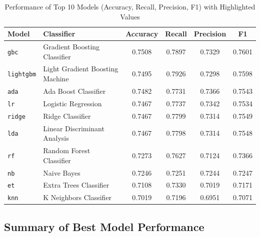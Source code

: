 \documentclass[a4paper,12pt]{article}
\begin{document}
\begin{table}[h!]
\centering
\begin{tabular}{l l c c c c}
\toprule
\textbf{Model} & \textbf{Classifier} & \textbf{Accuracy} & \textbf{Recall} & \textbf{Precision} & \textbf{F1} \\
\midrule
\texttt{gbc} & Gradient Boosting Classifier & \cellcolor{yellow}0.7508 & 0.7897 & 0.7329 & \cellcolor{yellow}0.7601 \\
\texttt{lightgbm} & Light Gradient Boosting Machine & 0.7495 & \cellcolor{yellow}0.7926 & 0.7298 & 0.7598 \\
\texttt{ada} & Ada Boost Classifier & 0.7482 & 0.7731 & \cellcolor{yellow}0.7366 & 0.7543 \\
\texttt{lr} & Logistic Regression & 0.7467 & 0.7737 & 0.7342 & 0.7534 \\
\texttt{ridge} & Ridge Classifier & 0.7467 & 0.7799 & 0.7314 & 0.7549 \\
\texttt{lda} & Linear Discriminant Analysis & 0.7467 & 0.7798 & 0.7314 & 0.7548 \\
\texttt{rf} & Random Forest Classifier & 0.7273 & 0.7627 & 0.7124 & 0.7366 \\
\texttt{nb} & Naive Bayes & 0.7246 & 0.7251 & 0.7244 & 0.7247 \\
\texttt{et} & Extra Trees Classifier & 0.7108 & 0.7330 & 0.7019 & 0.7171 \\
\texttt{knn} & K Neighbors Classifier & 0.7019 & 0.7196 & 0.6951 & 0.7071 \\
\bottomrule
\end{tabular}
\caption{Performance of Top 10 Models (Accuracy, Recall, Precision, F1) with Highlighted Values}
\label{tab:model_performance}
\end{table}
\subsection{Summary of Best Model Performance}
\end{document}
